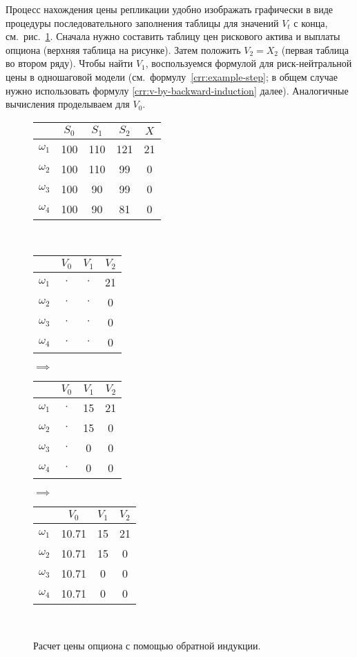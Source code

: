 \begin{remark}
Процесс нахождения цены репликации удобно изображать графически в виде процедуры последовательного заполнения таблицы для значений $V_t$ с конца, см.~рис.~\ref{crr:replication}. 
Сначала нужно составить таблицу цен рискового актива и выплаты опциона (верхняя таблица на рисунке).
Затем положить $V_2=X_2$ (первая таблица во втором ряду). Чтобы найти $V_1$, воспользуемся формулой для риск-нейтральной цены в одношаговой модели (см.~формулу~\eqref{crr:example-step}; в общем случае нужно использовать формулу \eqref{crr:v-by-backward-induction} далее).
Аналогичные вычисления проделываем для $V_0$.

\begin{figure}[h]
\centering
\begin{tabular}{r|ccc|c}
& $S_0$ & $S_1$ & $S_2$ & $X$ \\\hline
$\omega_1$ & 100 & 110 & 121 & 21 \\
$\omega_2$ & 100 & 110 & 99 & 0 \\
$\omega_3$ & 100 & 90 & 99 & 0 \\
$\omega_4$ & 100 & 90 & 81 & 0 \\
\end{tabular}
%
\\[2em]
%
\begin{tabular}{r|ccc}
& $V_0$ & $V_1$ & $V_2$  \\\hline
$\omega_1$ & $\boldsymbol\cdot$ & $\boldsymbol\cdot$  & 21 \\
$\omega_2$ & $\boldsymbol\cdot$ & $\boldsymbol\cdot$  & 0 \\
$\omega_3$ & $\boldsymbol\cdot$ & $\boldsymbol\cdot$  & 0 \\
$\omega_4$ & $\boldsymbol\cdot$ & $\boldsymbol\cdot$  & 0 \\
\end{tabular}
%
$\implies$
%
\begin{tabular}{r|ccc}
& $V_0$ & $V_1$ & $V_2$  \\\hline
$\omega_1$ & $\boldsymbol\cdot$ & 15  & 21 \\
$\omega_2$ & $\boldsymbol\cdot$ & 15  & 0 \\
$\omega_3$ & $\boldsymbol\cdot$ & 0  & 0 \\
$\omega_4$ & $\boldsymbol\cdot$ & 0  & 0 \\
\end{tabular}
%
$\implies$
%
\begin{tabular}{r|ccc}
& $V_0$ & $V_1$ & $V_2$  \\\hline
$\omega_1$ & 10.71 & 15  & 21 \\
$\omega_2$ & 10.71 & 15  & 0 \\
$\omega_3$ & 10.71 & 0  & 0 \\
$\omega_4$ & 10.71 & 0  & 0 \\
\end{tabular}\\[1em]
\caption{Расчет цены опциона с помощью обратной индукции.}
\label{crr:replication}
\end{figure}
\end{remark}



